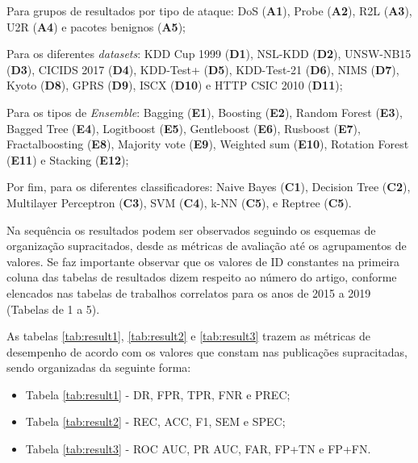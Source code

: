 Para grupos de resultados por tipo de ataque: DoS (\textbf{A1}), Probe (\textbf{A2}), R2L (\textbf{A3}), U2R (\textbf{A4}) e pacotes benignos (\textbf{A5});

Para os diferentes \textit{datasets}: KDD Cup 1999 (\textbf{D1}), NSL-KDD	(\textbf{D2}), UNSW-NB15	(\textbf{D3}), CICIDS 2017	(\textbf{D4}), KDD-Test+	(\textbf{D5}), KDD-Test-21	(\textbf{D6}), NIMS	(\textbf{D7}), Kyoto	(\textbf{D8}), GPRS	(\textbf{D9}), ISCX	(\textbf{D10}) e HTTP CSIC 2010	(\textbf{D11});

Para os tipos de \textit{Ensemble}: Bagging	(\textbf{E1}), Boosting	(\textbf{E2}), Random Forest	(\textbf{E3}), Bagged Tree	(\textbf{E4}), Logitboost	(\textbf{E5}), Gentleboost (\textbf{E6}), Rusboost	(\textbf{E7}), Fractalboosting	(\textbf{E8}), Majority vote	(\textbf{E9}), Weighted sum	(\textbf{E10}), Rotation Forest	(\textbf{E11}) e Stacking	(\textbf{E12});

Por fim, para os diferentes classificadores: Naive Bayes	(\textbf{C1}), Decision Tree	(\textbf{C2}), Multilayer Perceptron	(\textbf{C3}), SVM	(\textbf{C4}), k-NN (\textbf{C5}), e Reptree	(\textbf{C5}).

Na sequência os resultados podem ser observados seguindo os esquemas de organização supracitados, desde as métricas de avaliação até os agrupamentos de valores. Se faz importante observar que os valores de ID constantes na primeira coluna das tabelas de resultados dizem respeito ao número do artigo, conforme elencados nas tabelas de trabalhos correlatos para os anos de 2015 a 2019 (Tabelas de 1 a 5).

As tabelas \ref{tab:result1}, \ref{tab:result2} e \ref{tab:result3} trazem as métricas de desempenho de acordo com os valores que constam nas publicações supracitadas, sendo organizadas da seguinte forma:

\begin{itemize}
    \item Tabela \ref{tab:result1} - DR, FPR, TPR, FNR e PREC;
    \item Tabela \ref{tab:result2} - REC, ACC, F1, SEM e SPEC;
    \item Tabela \ref{tab:result3} - ROC AUC, PR AUC, FAR, FP+TN e FP+FN.
\end{itemize}


